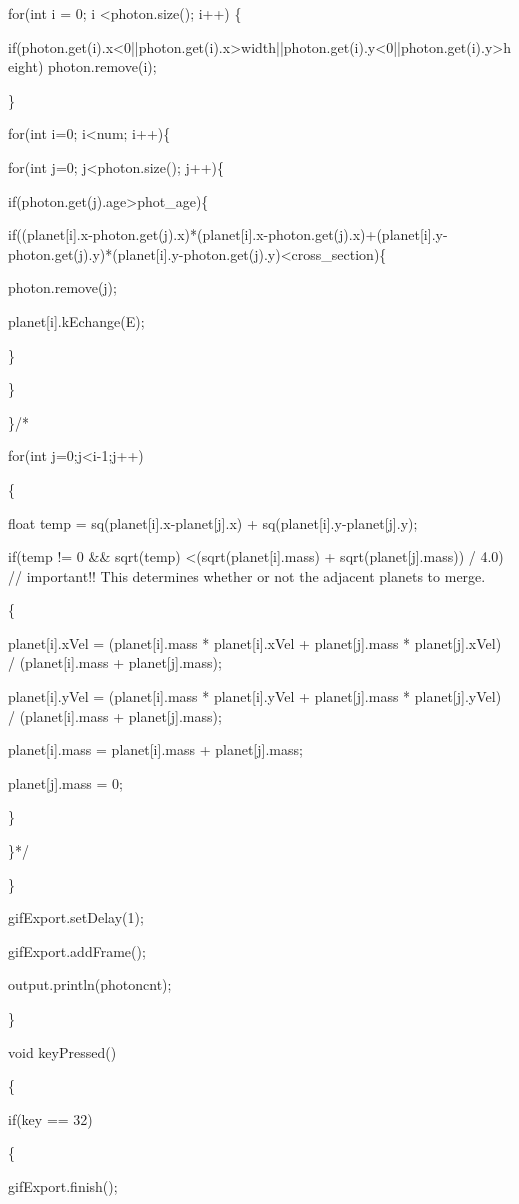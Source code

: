 \documentclass{gshs-hutech}
\begin{document}
\begin{tiny}
for(int i = 0; i \textless photon.size(); i++)
\{

	if(photon.get(i).x\textless 0||photon.get(i).x\textgreater width||photon.get(i).y\textless 0||photon.get(i).y\textgreater height)     photon.remove(i);
	
\}

for(int i=0; i\textless num; i++)\{

for(int j=0; j\textless photon.size(); j++)\{

if(photon.get(j).age\textgreater phot\_age)\{

if((planet[i].x-photon.get(j).x)*(planet[i].x-photon.get(j).x)+(planet[i].y-photon.get(j).y)*(planet[i].y-photon.get(j).y)\textless cross\_section)\{

photon.remove(j);

planet[i].kEchange(E);

\}

\}

\}/*

for(int j=0;j\textless i-1;j++)

\{

float temp = sq(planet[i].x-planet[j].x) + sq(planet[i].y-planet[j].y);

if(temp != 0 \&\& sqrt(temp) \textless (sqrt(planet[i].mass) + sqrt(planet[j].mass)) / 4.0) // important!! This determines whether or not the adjacent planets to merge.

\{

planet[i].xVel = (planet[i].mass * planet[i].xVel + planet[j].mass * planet[j].xVel) / (planet[i].mass + planet[j].mass);

planet[i].yVel = (planet[i].mass * planet[i].yVel + planet[j].mass * planet[j].yVel) / (planet[i].mass + planet[j].mass);

planet[i].mass = planet[i].mass + planet[j].mass;

planet[j].mass = 0;

\}

\}*/

\}

gifExport.setDelay(1);

gifExport.addFrame();

output.println(photoncnt);

\}

void keyPressed()

\{

if(key == 32)

\{

gifExport.finish();


\end{tiny}
\end{document}
